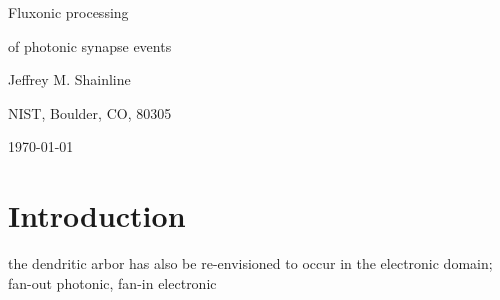 \documentclass[twocolumn]{article}
\begin{document}
	
	\centerline{\LARGE Fluxonic processing}
	\vspace{0.5em}
	\centerline{\LARGE of photonic synapse events}
	\vspace{0.75em}
	\centerline{\large Jeffrey M. Shainline}
	\vspace{0.5em}
	\centerline{\normalsize NIST, Boulder, CO, 80305}
	\vspace{0.5em}
	\centerline{\small \today}
	
\begin{abstract}

\end{abstract}

\tableofcontents

\section{\label{sec:introduction}Introduction}
	
the dendritic arbor has also be re-envisioned to occur in the electronic domain; fan-out photonic, fan-in electronic	

\begin{figure} 
\end{figure}
\end{document}
